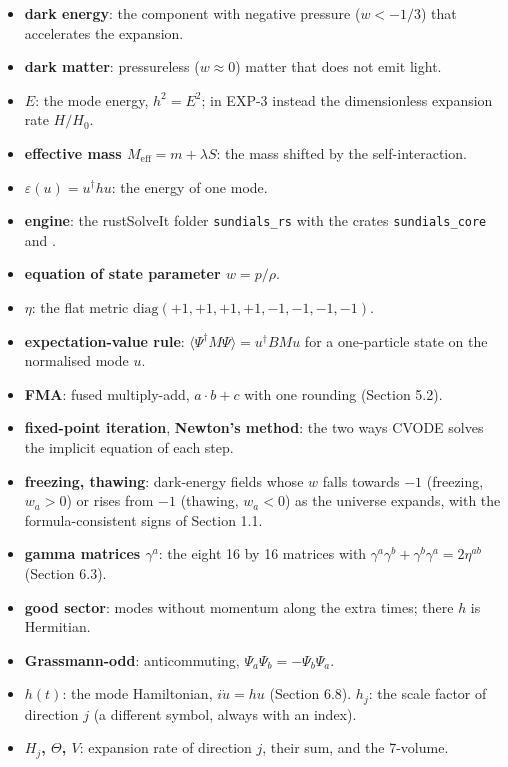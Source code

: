 \documentclass[11pt]{article}
\begin{document}
\begin{itemize}
\item \textbf{dark energy}: the component with negative pressure ($w<-1/3$) that accelerates the expansion.
\item \textbf{dark matter}: pressureless ($w\approx0$) matter that does not emit light.
\item \textbf{$E$}: the mode energy, $h^2=E^2$; in EXP-3 instead the dimensionless expansion rate $H/H_0$.
\item \textbf{effective mass $M_{\mathrm{eff}}=m+\lambda S$}: the mass shifted by the self-interaction.
\item \textbf{$\varepsilon(u)=u^\dagger hu$}: the energy of one mode.
\item \textbf{engine}: the rustSolveIt folder \texttt{sundials\allowbreak{}\_rs} with the crates \texttt{sundials\allowbreak{}\_core} and \texttt{}.
\item \textbf{equation of state parameter $w=p/\rho$}.
\item \textbf{$\eta$}: the flat metric $\mathrm{diag}(+1,+1,+1,+1,-1,-1,-1,-1)$.
\item \textbf{expectation-value rule}: $\langle\Psi^\dagger M\Psi\rangle=u^\dagger BMu$ for a one-particle state on the normalised mode $u$.
\item \textbf{FMA}: fused multiply-add, $a\cdot b+c$ with one rounding (Section 5.2).
\item \textbf{fixed-point iteration}, \textbf{Newton's method}: the two ways CVODE solves the implicit equation of each step.
\item \textbf{freezing, thawing}: dark-energy fields whose $w$ falls towards $-1$ (freezing, $w_a>0$) or rises from $-1$ (thawing, $w_a<0$) as the universe expands, with the formula-consistent signs of Section 1.1.
\item \textbf{gamma matrices $\gamma^a$}: the eight 16 by 16 matrices with $\gamma^a\gamma^b+\gamma^b\gamma^a=2\eta^{ab}$ (Section 6.3).
\item \textbf{good sector}: modes without momentum along the extra times; there $h$ is Hermitian.
\item \textbf{Grassmann-odd}: anticommuting, $\Psi_a\Psi_b=-\Psi_b\Psi_a$.
\item \textbf{$h(t)$}: the mode Hamiltonian, $i\dot u=hu$ (Section 6.8). \textbf{$h_j$}: the scale factor of direction $j$ (a different symbol, always with an index).
\item \textbf{$H_j$, $\Theta$, $V$}: expansion rate of direction $j$, their sum, and the 7-volume.

\end{itemize}
\end{document}
